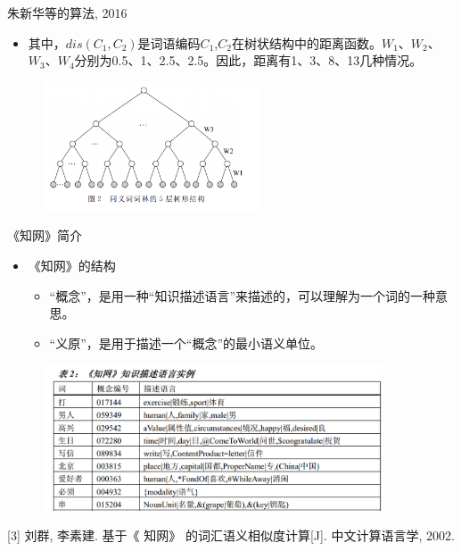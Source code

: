 \documentclass[aspectratio=169]{beamer} %
\begin{document}
    \begin{frame}{朱新华等的算法, 2016}
      \begin{itemize}
        \item 其中，$dis(C_1, C_2)$是词语编码$C_1$,$C_2$在树状结构中的距离函数。$W_1$、$W_2$、$W_3$、$W_4$分别为0.5、1、2.5、2.5。因此，距离有1、3、8、13几种情况。
      \end{itemize}
      \begin{figure}
      \includegraphics[width=2.52in,height=1.5in]{cilin2016.png}
      \end{figure}
    \end{frame}

    \begin{frame}{《知网》简介}
      \begin{itemize}
        \item 《知网》的结构
          \begin{itemize}
            \item “概念”，是用一种“知识描述语言”来描述的，可以理解为一个词的一种意思。
            \item “义原”，是用于描述一个“概念”的最小语义单位。
          \end{itemize}
      \end{itemize}
      \begin{figure}
      \includegraphics[width=4in,height=1.7in]{hownet1.png}
      \end{figure}
      \small
      [3] 刘群, 李素建. 基于《 知网》 的词汇语义相似度计算[J]. 中文计算语言学, 2002.
    \end{frame}
\end{document}
